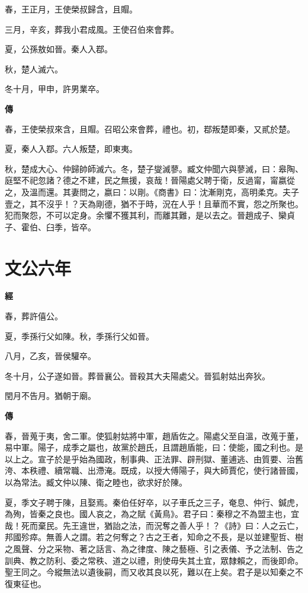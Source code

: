\documentclass{ctexart}
\begin{document}
春，王正月，王使榮叔歸含，且賵。

三月，辛亥，葬我小君成風。王使召伯來會葬。

夏，公孫敖如晉。秦人入鄀。

秋，楚人滅六。

冬十月，甲申，許男業卒。

\textbf{傳}



春，王使榮叔來含，且賵。召昭公來會葬，禮也。初，鄀叛楚即秦，又貳於楚。

夏，秦人入鄀。六人叛楚，即東夷。

秋，楚成大心、仲歸帥師滅六。冬，楚子燮滅蓼。臧文仲聞六與蓼滅，曰：皋陶、庭堅不祀忽諸？德之不建，民之無援，哀哉！晉陽處父聘于衛，反過甯，甯嬴從之，及溫而還。其妻問之，嬴曰：以剛。《商書》曰：沈漸剛克，高明柔克。夫子壹之，其不沒乎！？天為剛德，猶不于時，況在人乎！且華而不實，怨之所聚也。犯而聚怨，不可以定身。余懼不獲其利，而離其難，是以去之。晉趙成子、欒貞子、霍伯、臼季，皆卒。





\section{文公六年}


\textbf{經}



春，葬許僖公。

夏，季孫行父如陳。秋，季孫行父如晉。

八月，乙亥，晉侯驩卒。

冬十月，公子遂如晉。葬晉襄公。晉殺其大夫陽處父。晉狐射姑出奔狄。

閏月不告月。猶朝于廟。

\textbf{傳}



春，晉蒐于夷，舍二軍。使狐射姑將中軍，趙盾佐之。陽處父至自溫，改蒐于董，易中軍。陽子，成季之屬也，故黨於趙氏，且謂趙盾能，曰：使能，國之利也。是以上之。宣子於是乎始為國政，制事典、正法罪、辟刑獄、董逋逃、由質要、治舊洿、本秩禮、續常職、出滯淹。既成，以授大傅陽子，與大師賈佗，使行諸晉國，以為常法。臧文仲以陳、衛之睦也，欲求好於陳。

夏，季文子聘于陳，且娶焉。秦伯任好卒，以子車氏之三子，奄息、仲行、鍼虎，為殉，皆秦之良也。國人哀之，為之賦《黃鳥》。君子曰：秦穆之不為盟主也，宜哉！死而棄民。先王違世，猶詒之法，而況奪之善人乎！？《詩》曰：人之云亡，邦國殄瘁。無善人之謂。若之何奪之？古之王者，知命之不長，是以並建聖哲、樹之風聲、分之采物、著之話言、為之律度、陳之藝極、引之表儀、予之法制、告之訓典、教之防利、委之常秩、道之以禮，則使毋失其土宜，眾隸賴之，而後即命。聖王同之。今縱無法以遺後嗣，而又收其良以死，難以在上矣。君子是以知秦之不復東征也。
\end{document}
